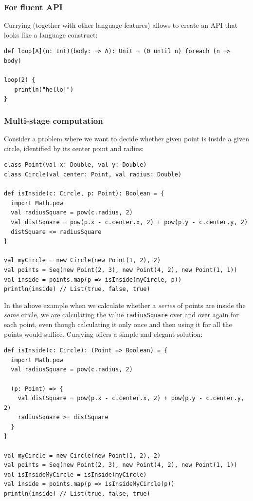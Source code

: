 \subsubsection{For fluent API}
Currying (together with other language features) allows to create an API that looks like a language construct:
\begin{lstlisting}
def loop[A](n: Int)(body: => A): Unit = (0 until n) foreach (n => body)

loop(2) {
   println("hello!")
}
\end{lstlisting}

\subsubsection{Multi-stage computation}

Consider a problem where we want to decide whether given point is inside a given circle, identified by its center point and radius:

\begin{lstlisting}
class Point(val x: Double, val y: Double)
class Circle(val center: Point, val radius: Double)

def isInside(c: Circle, p: Point): Boolean = {
  import Math.pow
  val radiusSquare = pow(c.radius, 2)
  val distSquare = pow(p.x - c.center.x, 2) + pow(p.y - c.center.y, 2)
  distSquare <= radiusSquare
}

val myCircle = new Circle(new Point(1, 2), 2)
val points = Seq(new Point(2, 3), new Point(4, 2), new Point(1, 1))
val inside = points.map(p => isInside(myCircle, p))
println(inside) // List(true, false, true)
\end{lstlisting}

In the above example when we calculate whether a \emph{series} of points are inside the \emph{same} circle, we are calculating the value \texttt{radiusSquare} over and over again for each point, even though calculating it only once and then using it for all the points would suffice. Currying offers a simple and elegant solution:
\begin{lstlisting}
def isInside(c: Circle): (Point => Boolean) = {
  import Math.pow
  val radiusSquare = pow(c.radius, 2)

  (p: Point) => {
    val distSquare = pow(p.x - c.center.x, 2) + pow(p.y - c.center.y, 2)
    radiusSquare >= distSquare
  }
}

val myCircle = new Circle(new Point(1, 2), 2)
val points = Seq(new Point(2, 3), new Point(4, 2), new Point(1, 1))
val isInsideMyCircle = isInside(myCircle)
val inside = points.map(p => isInsideMyCircle(p))
println(inside) // List(true, false, true)
\end{lstlisting}

